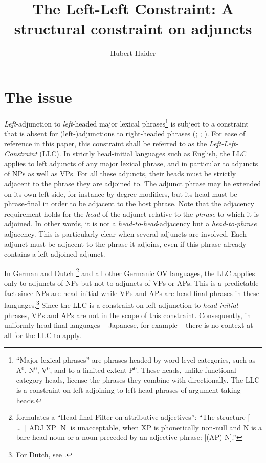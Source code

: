 \documentclass[output=paper
  ,nobabel
  ,uniformtopskip %
]{langscibook}
\title{The Left-Left Constraint: A structural constraint on adjuncts}
\author{Hubert Haider\orcid{0000-0001-7052-7607}\affiliation{University Salzburg}}
\begin{document}
\maketitle

\section{The issue}\label{sec-issue}

\emph{Left}-adjunction to \emph{left}-headed major lexical phrases\footnote{%
  ``Major lexical phrases'' are phrases headed by word-level categories, such as A$^0$, N$^0$, V$^0$, and to a
  limited extent P$^0$. These heads, unlike functional-category heads, license the phrases they combine with directionally. The LLC is a constraint on left-adjoining to left-head phrases of argument-taking heads.}  
is subject to a constraint that is absent for (left-)adjunctions to
right-headed phrases (\citealp[782--785]{Haider2004}; \citealp[194]{Haider2010}; \citealp[13--16,
34--37]{Haider2013}). For ease of reference in this paper, this constraint shall be referred to as
the \emph{Left-Left-Constraint} (LLC). In strictly head-initial languages such as English, the LLC
applies to left adjuncts of any major lexical phrase, and in particular to adjuncts of NPs as well
as VPs. For all these adjuncts, their heads must be strictly adjacent to the phrase they are
adjoined to. The adjunct phrase may be extended on its own left side, for instance by degree
modifiers, but its head must be phrase-final in order to be adjacent to the host phrase. Note that
the adjacency requirement holds for the \emph{head} of the adjunct relative to the \emph{phrase} to
which it is adjoined. In other words, it is not a \emph{head-to-head}-adjacency but a
\emph{head-to-phrase} adjacency. This is particularly clear when several adjuncts are involved. Each
adjunct must be adjacent to the phrase it adjoins, even if this phrase already contains a
left-adjoined adjunct.

In German and Dutch%
\footnote{\citet[292]{Broekhuis2013} formulates a ``Head-final Filter on attributive adjectives'':
``The structure [ \ldots\ [ ADJ XP] N\sharp] is unacceptable, when XP is phonetically non-null and N\sharp{} is a bare head noun or a noun preceded by an adjective phrase: [(AP) N].''
}
and all other Germanic OV languages, the LLC applies only to adjuncts of NPs but not to adjuncts of\kern1pt{}
VPs or APs. This is a predictable fact since NPs are head-initial while VPs and APs are head-final phrases in these languages.\footnote{For Dutch, see \citet*[291--293]{Broekhuis2013}.}  Since the LLC is a constraint on left-adjunction to \emph{head-initial} phrases, VPs and APs are not in the scope of this constraint. Consequently, in uniformly head-final languages – Japanese, for example – there is no context at all for the LLC to apply.
\end{document}
